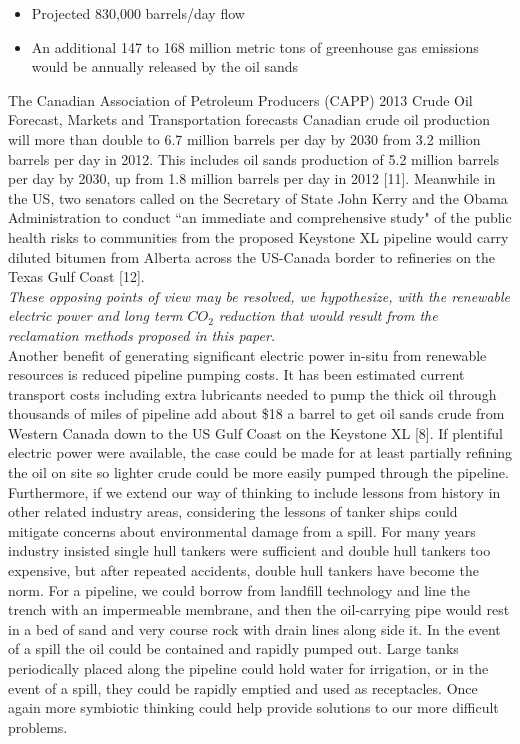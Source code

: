 \documentclass[12pt]{article}
\begin{document}
\begin{itemize}
\item Projected 830,000 barrels/day flow
\item An additional 147 to 168 million metric tons of greenhouse gas emissions would be annually released by the oil sands
\end{itemize}

The Canadian Association of Petroleum Producers (CAPP) 2013 Crude Oil Forecast, Markets and Transportation forecasts Canadian crude oil production will more than double to 6.7 million barrels per day by 2030 from 3.2 million barrels per day in 2012. This includes oil sands production of 5.2 million barrels per day by 2030, up from 1.8 million barrels per day in 2012 [11]. Meanwhile in the US, two senators called on the Secretary of State John Kerry and the Obama Administration to conduct “an immediate and comprehensive study" of the public health risks to communities from the proposed Keystone XL pipeline would carry diluted bitumen from Alberta across the US-Canada border to refineries on the Texas Gulf Coast [12]. \\

\emph{These opposing points of view may be resolved, we hypothesize, with the renewable electric power and long term $CO_2$ reduction that would result from the reclamation methods proposed in this paper.} \\

Another benefit of generating significant electric power in-situ from renewable resources is reduced pipeline pumping costs. It has been estimated current transport costs including extra lubricants needed to pump the thick oil through thousands of miles of pipeline add about \$18 a barrel to get oil sands crude from Western Canada down to the US Gulf Coast on the Keystone XL [8]. If plentiful electric power were available, the case could be made for at least partially refining the oil on site so lighter crude could be more easily pumped through the pipeline. \\

Furthermore, if we extend our way of thinking to include lessons from history in other related industry areas, considering the lessons of tanker ships could mitigate concerns about environmental damage from a spill.  For many years industry insisted single hull tankers were sufficient and double hull tankers too expensive, but after repeated accidents, double hull tankers have become the norm.  For a pipeline, we could borrow from landfill technology and line the trench with an impermeable membrane, and then the oil-carrying pipe would rest in a bed of sand and very course rock with drain lines along side it.  In the event of a spill the oil could be contained and rapidly pumped out.  Large tanks periodically placed along the pipeline could hold water for irrigation, or in the event of a spill, they could be rapidly emptied and used as receptacles.  Once again more symbiotic thinking could help provide solutions to our more difficult problems.
\end{document}
